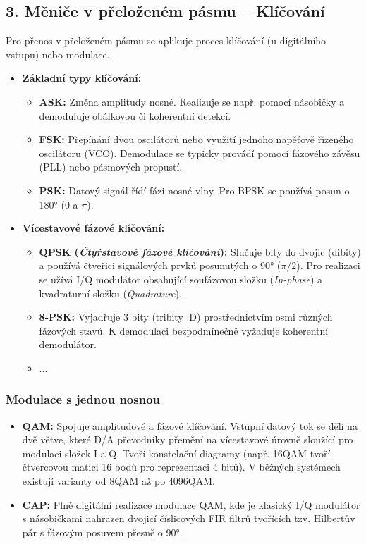     \subsection*{3. Měniče v přeloženém pásmu -- Klíčování}
        Pro přenos v přeloženém pásmu se aplikuje proces klíčování (u digitálního vstupu) nebo modulace.
        \begin{itemize}
            \item \textbf{Základní typy klíčování:}
            \begin{itemize}
                \item \textbf{ASK:} Změna amplitudy nosné. Realizuje se např. pomocí násobičky a demoduluje obálkovou či koherentní detekcí.
                \item \textbf{FSK:} Přepínání dvou oscilátorů nebo využití jednoho napěťově řízeného oscilátoru (VCO). Demodulace se typicky provádí pomocí fázového závěsu (PLL) nebo pásmových propustí.
                \item \textbf{PSK:} Datový signál řídí fázi nosné vlny. Pro BPSK se používá posun o 180° (0 a $\pi$).
            \end{itemize}
            \item \textbf{Vícestavové fázové klíčování:}
            \begin{itemize}
                \item \textbf{QPSK (\textit{Čtyřstavové fázové klíčování}):} Slučuje bity do dvojic (dibity) a používá čtveřici signálových prvků posunutých o 90° ($\pi/2$). Pro realizaci se užívá I/Q modulátor obsahující soufázovou složku (\textit{In-phase}) a kvadraturní složku (\textit{Quadrature}).
                \item \textbf{8-PSK:} Vyjadřuje 3 bity (tribity :D) prostřednictvím osmi různých fázových stavů. K demodulaci bezpodmínečně vyžaduje koherentní demodulátor.
                \item ...
            \end{itemize}
        \end{itemize}
    \subsubsection{Modulace s jednou nosnou}
        \begin{itemize}
            \item \textbf{QAM:} Spojuje amplitudové a fázové klíčování. Vstupní datový tok se dělí na dvě větve, které D/A převodníky přemění na vícestavové úrovně sloužící pro modulaci složek I a Q. Tvoří konstelační diagramy (např. 16QAM tvoří čtvercovou matici 16 bodů pro reprezentaci 4 bitů). V běžných systémech existují varianty od 8QAM  až po 4096QAM.
            \item \textbf{CAP:} Plně digitální realizace modulace QAM, kde je klasický I/Q modulátor s násobičkami nahrazen dvojicí číslicových FIR filtrů tvořících tzv. Hilbertův pár s fázovým posuvem přesně o 90°.
        \end{itemize}
